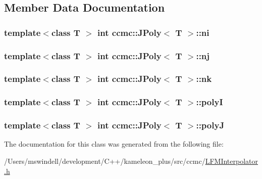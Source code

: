 \subsection{Member Data Documentation}
\hypertarget{classccmc_1_1_j_poly_a0bb48597758d01c4e439500780d101a7}{
\subsubsection[{ni}]{\setlength{\rightskip}{0pt plus 5cm}template$<$class T $>$ int {\bf ccmc\-::\-J\-Poly}$<$ T $>$\-::ni}}\label{classccmc_1_1_j_poly_a0bb48597758d01c4e439500780d101a7}
\hypertarget{classccmc_1_1_j_poly_aa7a29fd9cf2e058faa58309ae35fce5c}{
\subsubsection[{nj}]{\setlength{\rightskip}{0pt plus 5cm}template$<$class T $>$ int {\bf ccmc\-::\-J\-Poly}$<$ T $>$\-::nj}}\label{classccmc_1_1_j_poly_aa7a29fd9cf2e058faa58309ae35fce5c}
\hypertarget{classccmc_1_1_j_poly_a6870b304bbe9257d99d0a7aa02b11f37}{
\subsubsection[{nk}]{\setlength{\rightskip}{0pt plus 5cm}template$<$class T $>$ int {\bf ccmc\-::\-J\-Poly}$<$ T $>$\-::nk}}\label{classccmc_1_1_j_poly_a6870b304bbe9257d99d0a7aa02b11f37}
\hypertarget{classccmc_1_1_j_poly_a6a1be93e848453b2f5708cfe58fc9734}{
\subsubsection[{poly\-I}]{\setlength{\rightskip}{0pt plus 5cm}template$<$class T $>$ int {\bf ccmc\-::\-J\-Poly}$<$ T $>$\-::poly\-I}}\label{classccmc_1_1_j_poly_a6a1be93e848453b2f5708cfe58fc9734}
\hypertarget{classccmc_1_1_j_poly_ab127c7226a977fb88668fa22f4acfd93}{
\subsubsection[{poly\-J}]{\setlength{\rightskip}{0pt plus 5cm}template$<$class T $>$ int {\bf ccmc\-::\-J\-Poly}$<$ T $>$\-::poly\-J}}\label{classccmc_1_1_j_poly_ab127c7226a977fb88668fa22f4acfd93}


The documentation for this class was generated from the following file\-:\begin{DoxyCompactItemize}
\item 
/\-Users/mswindell/development/\-C++/kameleon\-\_\-plus/src/ccmc/\hyperlink{_l_f_m_interpolator_8h}{L\-F\-M\-Interpolator.\-h}\end{DoxyCompactItemize}
